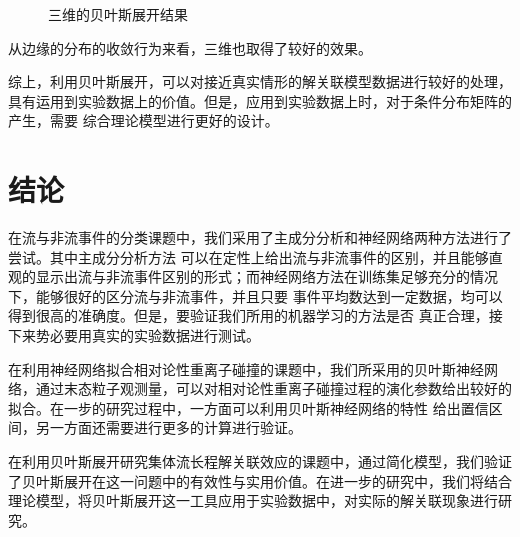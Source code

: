 \documentclass[aps,pre,12pt,preprint,onecolumn,showpacs,showkeys]{revtex4-1}
\begin{document}
\begin{enumerate}
\begin{figure}[htbp]
            \caption{三维的贝叶斯展开结果\label{fig:bu3d}}%
            \end{figure}
        从边缘的分布的收敛行为来看，三维也取得了较好的效果。\par
\end{enumerate}
综上，利用贝叶斯展开，可以对接近真实情形的解关联模型数据进行较好的处理，具有运用到实验数据上的价值。但是，应用到实验数据上时，对于条件分布矩阵的产生，需要
综合理论模型进行更好的设计。

\section{结论}
在流与非流事件的分类课题中，我们采用了主成分分析和神经网络两种方法进行了尝试。其中主成分分析方法
可以在定性上给出流与非流事件的区别，并且能够直观的显示出流与非流事件区别的形式；而神经网络方法在训练集足够充分的情况下，能够很好的区分流与非流事件，并且只要
事件平均数达到一定数据，均可以得到很高的准确度。但是，要验证我们所用的机器学习的方法是否
真正合理，接下来势必要用真实的实验数据进行测试。\par
在利用神经网络拟合相对论性重离子碰撞的课题中，我们所采用的贝叶斯神经网络，通过末态粒子观测量，可以对相对论性重离子碰撞过程的演化参数给出较好的拟合。在一步的研究过程中，一方面可以利用贝叶斯神经网络的特性
给出置信区间，另一方面还需要进行更多的计算进行验证。\par
在利用贝叶斯展开研究集体流长程解关联效应的课题中，通过简化模型，我们验证了贝叶斯展开在这一问题中的有效性与实用价值。在进一步的研究中，我们将结合理论模型，将贝叶斯展开这一工具应用于实验数据中，对实际的解关联现象进行研究。
\end{document}
